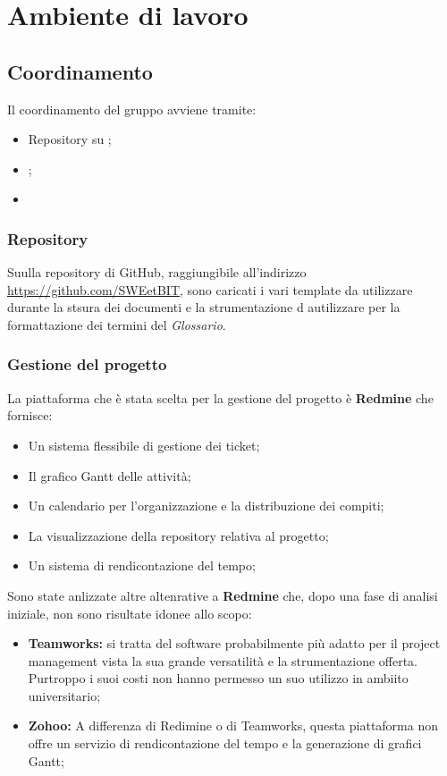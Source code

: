 \section{Ambiente di lavoro}
  \subsection{Coordinamento}
    Il coordinamento del gruppo avviene tramite:
    \begin{itemize}
      \item Repository su ;
      \item {};
      \item {}
    \end{itemize}
    \subsubsection{Repository}
      Suulla repository di GitHub, raggiungibile all'indirizzo \url{https://github.com/SWEetBIT}, sono caricati i vari template da utilizzare
      durante la stsura dei documenti e la strumentazione d autilizzare per la formattazione dei termini del \emph{Glossario}.
    \subsubsection{Gestione del progetto}
      La piattaforma che è stata scelta per la gestione del progetto è \textbf{Redmine} che fornisce:
      \begin{itemize}
        \item Un sistema flessibile di gestione dei ticket;
        \item Il grafico Gantt delle attività;
        \item Un calendario per l'organizzazione e la distribuzione dei compiti;
        \item La visualizzazione della repository relativa al progetto;
        \item Un sistema di rendicontazione del tempo;
      \end{itemize}
      Sono state anlizzate altre altenrative a \textbf{Redmine} che, dopo una fase di analisi iniziale, non sono risultate idonee allo scopo:
      \begin{itemize}
        \item \textbf{Teamworks: }si tratta del software probabilmente più adatto per il project management vista la sua grande versatilità e
        la strumentazione offerta. Purtroppo i suoi costi non hanno permesso un suo utilizzo in ambiito universitario;
        \item \textbf{Zohoo: }A differenza di Redimine o di Teamworks, questa piattaforma non offre un servizio di rendicontazione del tempo
        e la generazione di grafici Gantt;
      \end{itemize}
